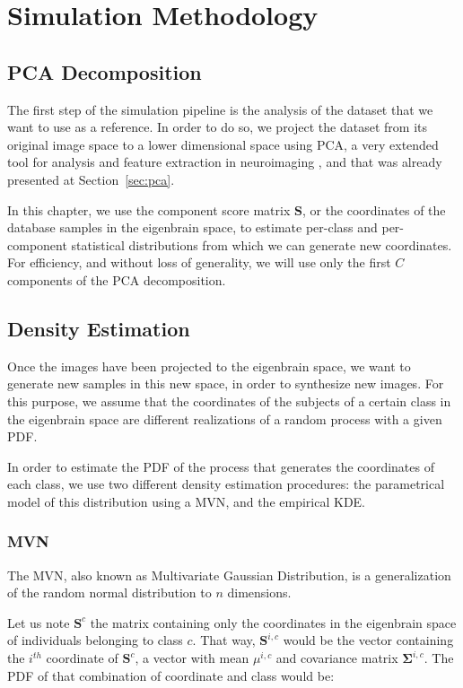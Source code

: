 \section{Simulation Methodology}
\subsection{\acs{PCA} Decomposition}
The first step of the simulation pipeline is the analysis of the dataset that we want to use as a reference. In order to do so, we project the dataset from its original image space to a lower dimensional space using \ac{PCA}, a very extended tool for analysis and feature extraction in neuroimaging \cite{Illan2011,Khedher2015}, and that was already presented at Section~\ref{sec:pca}.

In this chapter, we use the component score matrix $\mathbf{S}$, or the coordinates of the database samples in the eigenbrain space, to estimate per-class and per-component statistical distributions from which we can generate new coordinates. For efficiency, and without loss of generality, we will use only the first $C$ components of the \ac{PCA} decomposition. 

\subsection{Density Estimation}
Once the images have been projected to the eigenbrain space, we want to generate new samples in this new space, in order to synthesize new images. For this purpose, we assume that the coordinates of the subjects of a certain class in the eigenbrain space are different realizations of a random process with a given \ac{PDF}. 

In order to estimate the \ac{PDF} of the process that generates the coordinates of each class, we use two different density estimation procedures: the parametrical model of this distribution using a \acf{MVN}, and the empirical \acf{KDE}. 

\subsubsection{\acf{MVN}}
The \ac{MVN}, also known as Multivariate Gaussian Distribution, is a generalization of the random normal distribution to $n$ dimensions. 

Let us note $\mathbf{S}^{c}$ the matrix containing only the coordinates in the eigenbrain space of individuals belonging to class $c$. That way, $\mathbf{S}^{i,c}$ would be the vector containing the $i^{th}$ coordinate of $\mathbf{S}^{c}$, a vector with mean $\mu^{i,c}$ and covariance matrix $\boldsymbol{\Sigma}^{i,c}$. The \ac{PDF} of that combination of coordinate and class would be: 

